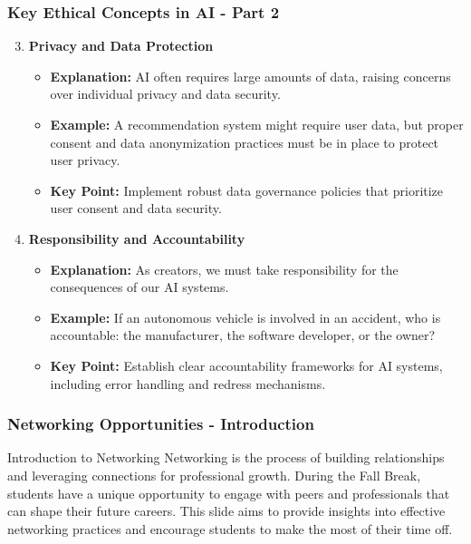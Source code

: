 \documentclass[aspectratio=169]{beamer}
\begin{document}
\begin{frame}[fragile]
  \frametitle{Key Ethical Concepts in AI - Part 2}
  
  \begin{enumerate}
    \setcounter{enumi}{2} %
    \item \textbf{Privacy and Data Protection}
      \begin{itemize}
        \item \textbf{Explanation:} AI often requires large amounts of data, raising concerns over individual privacy and data security.
        \item \textbf{Example:} A recommendation system might require user data, but proper consent and data anonymization practices must be in place to protect user privacy.
        \item \textbf{Key Point:} Implement robust data governance policies that prioritize user consent and data security.
      \end{itemize}
      
    \item \textbf{Responsibility and Accountability}
      \begin{itemize}
        \item \textbf{Explanation:} As creators, we must take responsibility for the consequences of our AI systems.
        \item \textbf{Example:} If an autonomous vehicle is involved in an accident, who is accountable: the manufacturer, the software developer, or the owner?
        \item \textbf{Key Point:} Establish clear accountability frameworks for AI systems, including error handling and redress mechanisms.
      \end{itemize}
  \end{enumerate}
  
\end{frame}

\begin{frame}[fragile]
    \frametitle{Networking Opportunities - Introduction}
    \begin{block}{Introduction to Networking}
        Networking is the process of building relationships and leveraging connections for professional growth. 
        During the Fall Break, students have a unique opportunity to engage with peers and professionals that can shape their future careers.
        This slide aims to provide insights into effective networking practices and encourage students to make the most of their time off.
    \end{block}
\end{frame}
\end{document}
